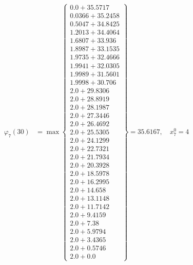 \documentclass{article}
\begin{document}
\begin{align*}
  
\varphi_{7}(30) &= \max \left\{ \begin{array}{c}
0.0 + 35.5717 \\
 0.0366 + 35.2458 \\
 0.5047 + 34.8425 \\
 1.2013 + 34.4064 \\
 1.6807 + 33.936 \\
 1.8987 + 33.1535 \\
 1.9735 + 32.4666 \\
 1.9941 + 32.0305 \\
 1.9989 + 31.5601 \\
 1.9998 + 30.706 \\
 2.0 + 29.8306 \\
 2.0 + 28.8919 \\
 2.0 + 28.1987 \\
 2.0 + 27.3446 \\
 2.0 + 26.4692 \\
 2.0 + 25.5305 \\
 2.0 + 24.1299 \\
 2.0 + 22.7321 \\
 2.0 + 21.7934 \\
 2.0 + 20.3928 \\
 2.0 + 18.5978 \\
 2.0 + 16.2995 \\
 2.0 + 14.658 \\
 2.0 + 13.1148 \\
 2.0 + 11.7142 \\
 2.0 + 9.4159 \\
 2.0 + 7.38 \\
 2.0 + 5.9794 \\
 2.0 + 3.4365 \\
 2.0 + 0.5746 \\
 2.0 + 0.0
\end{array} \right\}=35.6167,\quad x_{7}^0=4\\
  
  
  

\end{align*}
\end{document}
